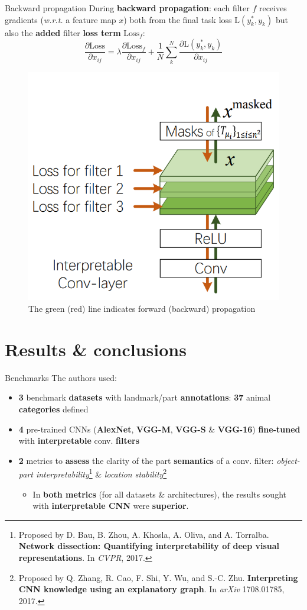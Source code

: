 \documentclass{beamer}
\begin{document}
\begin{frame}{Backward propagation}
	During \textbf{backward propagation}: each filter $f$ receives gradients (\textit{w.r.t.} a feature map $x$) both from the final task loss $\mathbf{\mathrm{L}}(y_k^{*}, y_k)$ but also the \textbf{added} filter \textbf{loss term} $\mathbf{\mathrm{Loss}}_f$: $$ \frac{\partial \mathbf{\mathrm{Loss}}}{\partial x_{ij}} = \lambda\frac{\partial \mathbf{\mathrm{Loss}}_f}{\partial x_{ij}} + \frac{1}{N}\sum^{N}_{k} \frac{\partial \mathbf{\mathrm{L}}(y_k^{*}, y_k)}{\partial x_{ij}} $$ %
    \begin{figure}
        \centering
        \includegraphics[width=0.35\linewidth]{figures/interpretable_cnn.png}
        \caption{The green (red) line indicates forward (backward) propagation}
        \label{fig:learning_scheme}
    \end{figure}
\end{frame}

\section{Results \& conclusions}

\begin{frame}{Benchmarks}
The authors used:
\begin{itemize}%
    \item \textbf{3} benchmark \textbf{datasets} with landmark/part \textbf{annotations}: \textbf{37} animal \textbf{categories} defined
    \item \textbf{4} pre-trained CNNs (\textbf{AlexNet}, \textbf{VGG-M}, \textbf{VGG-S} \& \textbf{VGG-16}) \textbf{fine-tuned} with \textbf{interpretable} conv. \textbf{filters}
    \item \textbf{2} metrics to \textbf{assess} the clarity of the part \textbf{semantics} of a conv. filter: \textit{object-part interpretability}\footnote{Proposed by D. Bau, B. Zhou, A. Khosla, A. Oliva, and A. Torralba. \textbf{Network dissection: Quantifying interpretability of deep visual representations}. In \textit{CVPR}, 2017.} \& \textit{location stability}\footnote{Proposed by Q. Zhang, R. Cao, F. Shi, Y. Wu, and S.-C. Zhu. \textbf{Interpreting CNN knowledge using an explanatory graph}. In \textit{arXiv} 1708.01785, 2017.}
    \begin{itemize}[<+->]
        \item In \textbf{both metrics} (for all datasets \& architectures), the results sought with \textbf{interpretable CNN} were \textbf{superior}.
    \end{itemize}
\end{itemize}
\end{frame}
\end{document}
